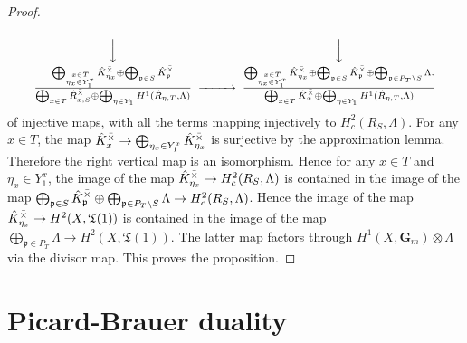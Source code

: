 \documentclass{amsart}
\theoremstyle{remark}
\numberwithin{equation}{section}
\newcommand{\tensor}{\mathbin{\otimes}}
\newcommand{\Gm}{\mathbf{G}_{m}}
\newcommand{\ideal}[1]{\mathfrak{#1}}
\begin{document}
\begin{proof}
\[\begin{CD}
{					}
				\\ @VVV @VVV \\
					\frac{
							\bigoplus_{
								\substack{
									\scriptscriptstyle
									x \in T \\
									\scriptscriptstyle
									\eta_{x} \in Y_{1}^{x}
								}
							}
								\Hat{K}_{\eta_{x}}^{\Bar{\times}}
						\oplus
							\bigoplus_{\ideal{p} \in S}
								\Hat{K}_{\ideal{p}}^{\Bar{\times}}
					}{
							\bigoplus_{x \in T}
								\Hat{R}_{x, S}^{\Bar{\times}}
						\oplus
							\bigoplus_{\eta \in Y_{1}}
								H^{1}(\Hat{R}_{\eta, T}, \Lambda)
					}
				@>>>
					\frac{
							\bigoplus_{
								\substack{
									\scriptscriptstyle
									x \in T \\
									\scriptscriptstyle
									\eta_{x} \in Y_{1}^{x}
								}
							}
								\Hat{K}_{\eta_{x}}^{\Bar{\times}}
						\oplus
							\bigoplus_{\ideal{p} \in S}
								\Hat{K}_{\ideal{p}}^{\Bar{\times}}
						\oplus
							\bigoplus_{\ideal{p} \in P_{T} \setminus S}
								\Lambda.
					}{
							\bigoplus_{x \in T}
								\Hat{K}_{x}^{\Bar{\times}}
						\oplus
							\bigoplus_{\eta \in Y_{1}}
								H^{1}(\Hat{R}_{\eta, T}, \Lambda)
					}
			\end{CD}
		\]
	of injective maps, with all the terms mapping injectively to
	$H^{2}_{c}(R_{S}, \Lambda)$.
	For any $x \in T$, the map
		$
				\Hat{K}_{x}^{\Bar{\times}}
			\to
				\bigoplus_{\eta_{x} \in Y_{1}^{x}}
					\Hat{K}_{\eta_{x}}^{\Bar{\times}}
		$
	is surjective by the approximation lemma.
	Therefore the right vertical map is an isomorphism.
	Hence for any $x \in T$ and $\eta_{x} \in Y_{1}^{x}$,
	the image of the map
	$\Hat{K}_{\eta_{x}}^{\Bar{\times}} \to H^{2}_{c}(R_{S}, \Lambda)$
	is contained in the image of the map
		$
					\bigoplus_{\ideal{p} \in S}
						\Hat{K}_{\ideal{p}}^{\Bar{\times}}
				\oplus
					\bigoplus_{\ideal{p} \in P_{T} \setminus S}
						\Lambda
			\to
				H^{2}_{c}(R_{S}, \Lambda)
		$.
	Hence the image of the map
	$\Hat{K}_{\eta_{x}}^{\Bar{\times}} \to H^{2}(X, \mathfrak{T}(1))$
	is contained in the image of the map
		$
				\bigoplus_{\ideal{p} \in P_{T}}
					\Lambda
			\to
				H^{2}(X, \mathfrak{T}(1))
		$.
	The latter map factors through $H^{1}(X, \Gm) \tensor \Lambda$
	via the divisor map.
	This proves the proposition.
\end{proof}


\section{Picard-Brauer duality}
\label{0118}
\end{document}
